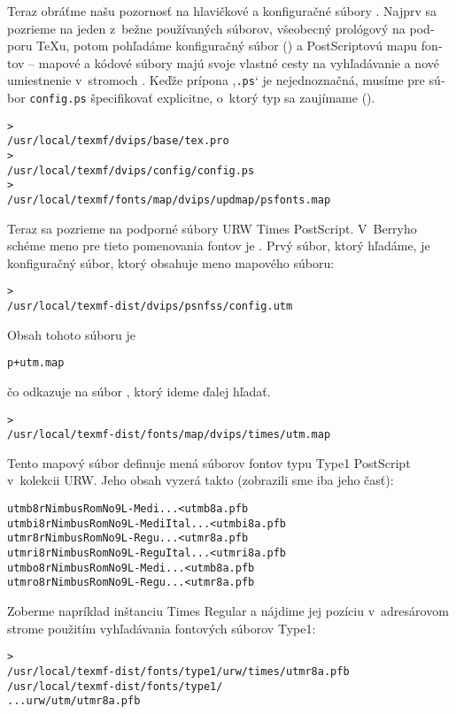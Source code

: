 \documentclass[\classoptions,slovak,english,czech]{\classname}
\newcommand{\singleuv}[1]{,#1`}
\begin{document}
\begin{otherlanguage}{slovak}
Teraz obráťme našu pozornosť na hlavičkové a konfiguračné súbory
. Najprv sa pozrieme na jeden z~bežne používaných
súborov, všeobecný  prológový  na pod\-poru \TeX u{},
potom pohľadáme konfiguračný súbor () a
PostScriptovú mapu fontov  --  
mapové a kódové súbory majú svoje vlastné cesty na 
vyhľadávanie a nové umiestnenie v~stromoch .  
Keďže prípona
\singleuv{\texttt{.ps}} je ne\-jed\-no\-značná, musíme pre súbor \texttt{config.ps}
špecifikovať explicitne, o~ktorý typ sa zaujímame ().
\begin{alltt}
> 
  /usr/local/texmf/dvips/base/tex.pro
> 
   /usr/local/texmf/dvips/config/config.ps
> 
   /usr/local/texmf/fonts/map/dvips/updmap/psfonts.map
\end{alltt}
Teraz sa pozrieme na podporné súbory URW Times PostScript.
V~Berryho schéme meno pre
tieto pomenovania fontov je . Prvý
súbor, ktorý hľadáme, je konfiguračný súbor, ktorý obsahuje meno
mapového súboru:
\begin{alltt}
> 
   /usr/local/texmf-dist/dvips/psnfss/config.utm
\end{alltt}
Obsah tohoto súboru je
\begin{alltt}
  p +utm.map
\end{alltt}
čo odkazuje na súbor , ktorý ideme ďalej hľadať.
\begin{alltt}
> 
   /usr/local/texmf-dist/fonts/map/dvips/times/utm.map
\end{alltt}
Tento mapový súbor definuje mená súborov fontov typu Type1
PostScript v~kolekcii URW. Jeho obsah vyzerá takto (zobrazili sme
iba jeho časť):
\begin{alltt}
  utmb8r  NimbusRomNo9L-Medi    ... <utmb8a.pfb
  utmbi8r NimbusRomNo9L-MediItal... <utmbi8a.pfb
  utmr8r  NimbusRomNo9L-Regu    ... <utmr8a.pfb
  utmri8r NimbusRomNo9L-ReguItal... <utmri8a.pfb
  utmbo8r NimbusRomNo9L-Medi    ... <utmb8a.pfb
  utmro8r NimbusRomNo9L-Regu    ... <utmr8a.pfb
\end{alltt}
Zoberme napríklad inštanciu Times Regular  a
nájdime jej pozíciu v~adresárovom strome  použitím
vyhľadávania fontových súborov Type1:
\begin{alltt}
> 
\ifSingleColumn   /usr/local/texmf-dist/fonts/type1/urw/times/utmr8a.pfb
\else   /usr/local/texmf-dist/fonts/type1/
... urw/utm/utmr8a.pfb
\fi\end{alltt}


\end{otherlanguage}
\end{document}
